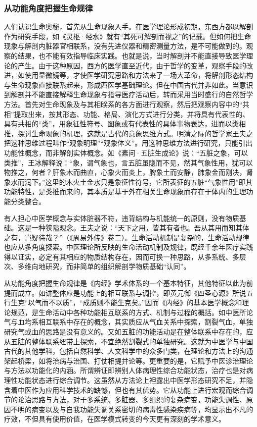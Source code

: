 \documentclass[draft,12pt]{ctexbook}
\begin{document}
\subsubsection{从功能角度把握生命规律}%

人们认识生命奥秘，首先从生命现象入手。在医学理论形成初期，东西方都以解剖作为研究手段，如《灵枢·经水》就有“其死可解剖而视之”的记载。但如何把生命现象与解剖内脏器官相联系，没有先进仪器和精密测量方法，是不可能做到的。观察的结果，也不能有效指导临床实践。也就是说，当时解剖并不能直接导致医学理论的产生。由于这种原因，西方的医学直至近代，由于哲学的变革，观察手段的改进，如使用显微镜等，才使医学研究思路和方法来了一场大革命，将解剖形态结构与生命现象直接联系起来，形成西医学基础理论。但在中国古代并非如此。当意识到解剖并不能直接解释生命现象与指导医疗活动后，转而采用当时盛行的自然哲学方法。首先对生命现象及与其相眹系的各方面进行观察，然后把观察内容中的“共相”提取出来，按其形态、功能、格局、演化方式进行分类，并将具有代表性的、具有共相的“类”，用象征性符号、图象或有代表性的具体事物表达，进而以类相推，探讨生命现象的机理，这就是古代的意象思维方式。明清之际的哲学家王夫之把这种思维过程叫作“观象明理”“观象体义”。用这种思维方法进行研究，只能引出功能性概念，而非解剖实体概念。如《素问·五脏生成论》说：“五脏之象，可以类推”，王冰解释说：“象，谓气象也，言五脏虽隐而不见，然其气象性用，犹可以物推之，何者？肝象木而曲直，心象火而炎上，脾象土而安静，肺象金而刚决，肾象水而润下。”这里的木火土金水只是象征性符号，它所表征的五脏“气象性用”即其功能特性，是类推而来的，其本质是基于外在相关生命现象而存在于体内的生理功能分类整合。

有人担心中医学概念与实体脏器不符，违背结构与机能统一的原则，没有物质基础。这是一种狭隘观念。王夫之说：“天下之用，皆其有者也。吾从其用而知其体之有，岂疑待哉？”（《周易外传》卷二）。生命活动机制是复杂的，生命活动规律也应从多角度探索。中医理论所反映的生命活动机制及规律，既经千余年医疗实践得以证实，必定有其相应的物质结构存在，因而可换一种思路，从多系统、多层次、多维向地研究，而非简单的组织解剖学物质基础“认同”。

从功能角度把握生命规律是《内经》学术体系的一个基本特征，其他特征以此为前提而成立。如讲整体应是功能上的相互联系与调控，即黄元御《四圣心源》所说五行生克“以气而不以质”，“成质则不能生克矣。”因而《内经》的基本医学概念和理论规范，是生命活动中各种功能相互联系的方式、机制与过程的概括。如中医所论气与血均系相互联系中存在的概念，其实质应从气血关系中探索，割裂气血，单独研究气或血的思路是没有意义的。又如五脏的功能活动是在整体联系中存在的，应从五脏的整体联系纽带上探索，不宜绝然割裂式的单独研究。这就为中医学与中国古代的其他学科，包括自然科学、人文科学中的众多门类，在理论和方法上的沟通架起桥梁，如将治病与治国、打仗相提并论等。更重要的是，它赋予中医诊治理论与方法以功能化的内涵。所谓辨证即辨别人体病理性综合功能状态，治疗也是对病理性功能状态进行综合调节。这虽然从方法论上袒露出中医学形态研究不足，并隐含着中医作为应用科学技术的缺憾，但也有其优势。它从功能上进行宏观而综合调节的论治思路与方法，对于多系统、多脏器、多组织的复杂病变，功能失调性、原因不明的病变以及与自我功能失调关系密切的病毒性感染疾病等，均显示出不凡的疗效，不但具有使用价值，在医学模式转变的今天更有深刻的学术意义。
\end{document}
